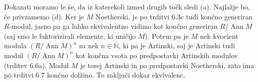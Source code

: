 \documentclass[a4paper, 12pt]{article}
\DeclareMathOperator{\Ann}{Ann}
\newcommand{\N}{\mathbb{N}}
\begin{document}
 Dokazati moramo le še, da iz katerekoli izmed drugih točk sledi (a). Najlažje bo, če privzamemo (d). Ker je $M$ Noetherski, je po trditvi 6.3c tudi končno generiran $R$-modul, jasno pa ga lahko ekvivalentno vidimo kot končno generiran $R/\Ann M$ (saj smo le faktorizirali elemente, ki uničijo $M$). Potem pa je $M$ nek kvocient modula $\left( R/\Ann M\right)^n$ za nek $n \in \N$, ki pa je Artinski, saj je Artinski tudi modul $\left(R/\Ann M\right)^n$ kot končna vsota po predpostavki Artinskih modulov (trditev 6.6a).
 Modul $M$ je torej Artinski in po predpostavki Noetherski, zato ima po trditvi 6.7 končno dolžino. To zaključi dokaz ekvivalenc.
\end{document}
